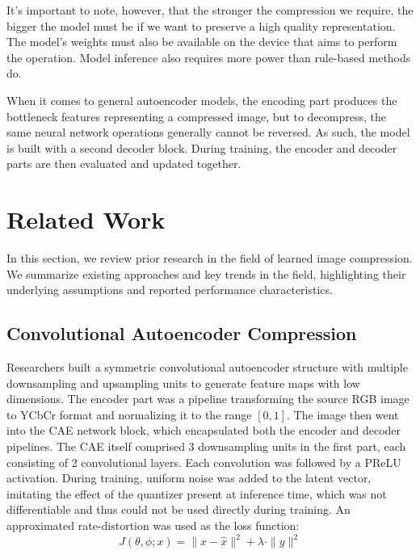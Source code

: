 \documentclass[conference]{IEEEtran}
\begin{document}
It's important to note, however, that the stronger the compression we require, the bigger the model must be if we want to preserve a high quality representation. The model's weights must also be available on the device that aims to perform the operation. Model inference also requires more power than rule-based methods do.

When it comes to general autoencoder models, the encoding part produces the bottleneck features representing a compressed image, but to decompress, the same neural network operations generally cannot be reversed. As such, the model is built with a second decoder block. During training, the encoder and decoder parts are then evaluated and updated together.


\section{Related Work}
In this section, we review prior research in the field of learned image compression. We summarize existing approaches and key trends in the field, highlighting their underlying assumptions and reported performance characteristics.

\subsection{Convolutional Autoencoder Compression}

Researchers \cite{cheng_deep_2018} built a symmetric convolutional autoencoder structure with multiple downsampling and upsampling units to generate feature maps with low dimensions. The encoder part was a pipeline transforming the source RGB image to YCbCr format and normalizing it to the range $[0,1]$. The image then went into the CAE network block, which encapsulated both the encoder and decoder pipelines. The CAE itself comprised 3 downsampling units in the first part, each consisting of 2 convolutional layers. Each convolution was followed by a PReLU activation. During training, uniform noise was added to the latent vector, imitating the effect of the quantizer present at inference time, which was not differentiable and thus could not be used directly during training. An approximated rate-distortion was used as the loss function:
\begin{equation}
    J(\theta, \phi; x) = \|x - \hat{x}\|^2 + \lambda \cdot \|y\|^2
    \label{eq:cae_loss}
\end{equation}
\end{document}
